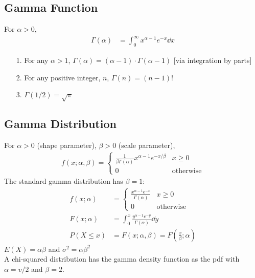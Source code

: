\documentclass[paper=A4, pagesize, fontsize=7pt, DIV=calc]{scrartcl}
\begin{document}
\begin{minipage}[t]{.45\linewidth}
  \subsection{Gamma Function}
  For $\alpha > 0$,
  \begin{align*}
    \Gamma(\alpha) &= \int_{0}^{\infty} x^{\alpha - 1} e^{-x} \dd{x}
  \end{align*}
  \begin{enumerate}
    \item[1.]
      For any $\alpha > 1$, $\Gamma(\alpha) = (\alpha - 1) \cdot \Gamma(\alpha - 1)$ [via integration by parts]
    \item[2.]
      For any positive integer, $n$, $\Gamma(n) = (n - 1)!$
    \item[3.]
      $\Gamma(1/2) = \sqrt{\pi}$
  \end{enumerate}

  \subsection{Gamma Distribution}
  For $\alpha > 0$ (shape parameter), $\beta > 0$ (scale parameter),
  \begin{align*}
    f(x; \alpha, \beta) = \begin{cases}
      \frac{1}{\beta\Gamma(\alpha)} x^{\alpha - 1} e^{-x/\beta} & x \ge 0 \\
      0 & \text{otherwise}
    \end{cases}
  \end{align*}
  The standard gamma distribution has $\beta = 1$:
  \begin{align*}
    f(x; \alpha) &= \begin{cases}
      \frac{x^{\alpha - 1} e^{-x}}{\Gamma(\alpha)} & x \ge 0 \\
      0                                            & \text{otherwise}
    \end{cases} \\
    F(x; \alpha) &= \int_{0}^{x} \frac{y^{\alpha - 1} e^{-y}}{\Gamma(\alpha)} \dd{y} \\
    P(X \le x) &= F(x; \alpha, \beta) = F\left(\frac{x}{\beta}; \alpha\right)
  \end{align*}
  $E(X) = \alpha\beta$ and $\sigma^2 = \alpha\beta^2$ \\
  A chi-squared distribution has the gamma density function as the pdf with $\alpha = v/2$ and $\beta = 2$.
\end{minipage}
\end{document}

